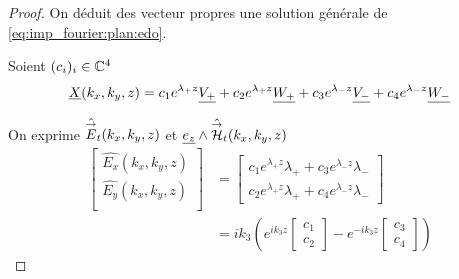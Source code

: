     \begin{proof}
        On déduit des vecteur propres une solution générale de \eqref{eq:imp_fourier:plan:edo}.

        Soient $(c_i)_{i} \in \mathbb C^4$
        \begin{equation}
            \underline{X}(k_x,k_y,z) = c_1e^{\lambda_+ z}\underline{V_+}  + c_2e^{\lambda_+ z}\underline{W_+} + c_3e^{\lambda_- z}\underline{V_-} +c_4e^{\lambda_- z}\underline{W_-}
        \end{equation}

        On exprime $\hat {{\overset{\rightarrow}{E}}}_t(k_x,k_y,z)$ et $\underline{e_z} \wedge \hat {{\overset{\rightarrow}{\mathcal{H}}}}_t(k_x,k_y,z)$ 
        \begin{align}
            \begin{bmatrix}
                \hat{E_x}(k_x,k_y,z)\\
                \hat{E_y}(k_x,k_y,z)\\
            \end{bmatrix}
            &=
            \begin{bmatrix}
                c_1 e^{\lambda_+ z} \lambda_{+} + c_3 e^{\lambda_- z} \lambda_{-} \\
                c_2 e^{\lambda_+ z} \lambda_{+} + c_4 e^{\lambda_- z} \lambda_{-}
            \end{bmatrix}\\
            &=ik_3\left( e^{ik_3 z}
            \begin{bmatrix}
                c_1 \\
                c_2
            \end{bmatrix}
            -e^{-ik_3 z}
            \begin{bmatrix}
                c_3 \\
                c_4
            \end{bmatrix}
            \right)
        \end{align}


\end{proof}

